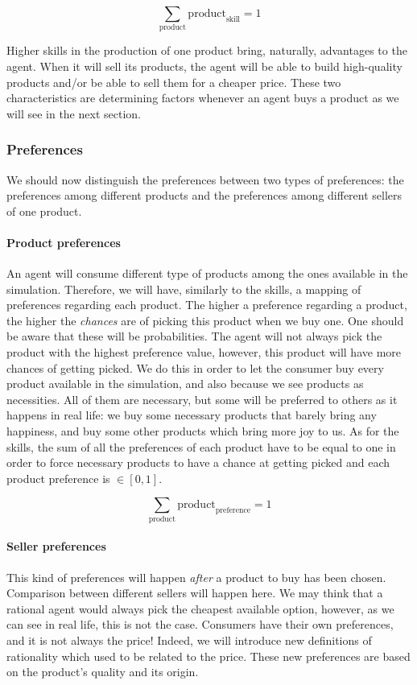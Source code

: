 $$\sum_{\text{product}} \text{product}_{\text{skill}} = 1$$

Higher skills in the production of one product bring, naturally, advantages to the agent. When it will sell its products, the agent will be able to build high-quality products and/or be able to sell them for a cheaper price. These two characteristics are determining factors whenever an agent buys a product as we will see in the next section.

\subsubsection{Preferences}\label{section:preferences}
We should now distinguish the preferences between two types of preferences: the preferences among different products and the preferences among different sellers of one product.

\paragraph{Product preferences} An agent will consume different type of products among the ones available in the simulation. Therefore, we will have, similarly to the skills, a mapping of preferences regarding each product. The higher a preference regarding a product, the higher the \emph{chances} are of picking this product when we buy one. One should be aware that these will be probabilities. The agent will not always pick the product with the highest preference value, however, this product will have more chances of getting picked.
We do this in order to let the consumer buy every product available in the simulation, and also because we see products as necessities. All of them are necessary, but some will be preferred to others as it happens in real life: we buy some necessary products that barely bring any happiness, and buy some other products which bring more joy to us.
As for the skills, the sum of all the preferences of each product have to be equal to one in order to force necessary products to have a chance at getting picked and each product preference is $\in [0,1]$.

$$\sum_{\text{product}} \text{product}_{\text{preference}} = 1$$

\paragraph{Seller preferences}
This kind of preferences will happen \emph{after} a product to buy has been chosen. Comparison between different sellers will happen here.
We may think that a rational agent would always pick the cheapest available option, however, as we can see in real life, this is not the case. Consumers have their own preferences, and it is not always the price! Indeed, we will introduce new definitions of rationality which used to be related to the price. These new preferences are based on the product's quality and its origin.

